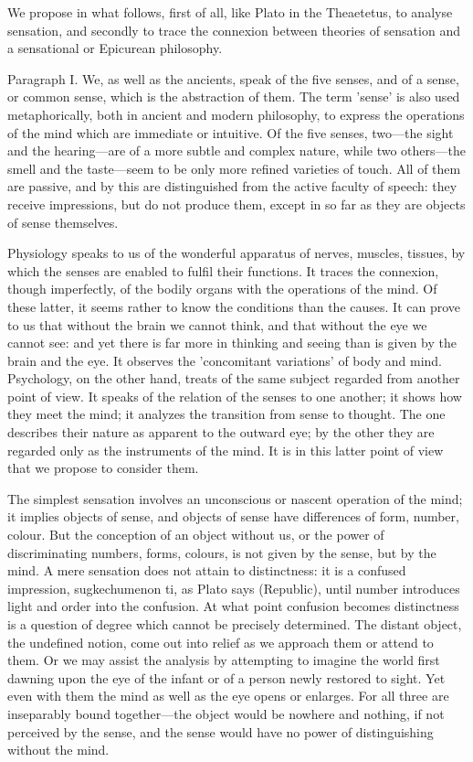 \documentclass[11pt,letter]{article}
\begin{document}
\par  We propose in what follows, first of all, like Plato in the Theaetetus, to analyse sensation, and secondly to trace the connexion between theories of sensation and a sensational or Epicurean philosophy.

\par  Paragraph I. We, as well as the ancients, speak of the five senses, and of a sense, or common sense, which is the abstraction of them. The term 'sense' is also used metaphorically, both in ancient and modern philosophy, to express the operations of the mind which are immediate or intuitive. Of the five senses, two—the sight and the hearing—are of a more subtle and complex nature, while two others—the smell and the taste—seem to be only more refined varieties of touch. All of them are passive, and by this are distinguished from the active faculty of speech: they receive impressions, but do not produce them, except in so far as they are objects of sense themselves.

\par  Physiology speaks to us of the wonderful apparatus of nerves, muscles, tissues, by which the senses are enabled to fulfil their functions. It traces the connexion, though imperfectly, of the bodily organs with the operations of the mind. Of these latter, it seems rather to know the conditions than the causes. It can prove to us that without the brain we cannot think, and that without the eye we cannot see: and yet there is far more in thinking and seeing than is given by the brain and the eye. It observes the 'concomitant variations' of body and mind. Psychology, on the other hand, treats of the same subject regarded from another point of view. It speaks of the relation of the senses to one another; it shows how they meet the mind; it analyzes the transition from sense to thought. The one describes their nature as apparent to the outward eye; by the other they are regarded only as the instruments of the mind. It is in this latter point of view that we propose to consider them.

\par  The simplest sensation involves an unconscious or nascent operation of the mind; it implies objects of sense, and objects of sense have differences of form, number, colour. But the conception of an object without us, or the power of discriminating numbers, forms, colours, is not given by the sense, but by the mind. A mere sensation does not attain to distinctness: it is a confused impression, sugkechumenon ti, as Plato says (Republic), until number introduces light and order into the confusion. At what point confusion becomes distinctness is a question of degree which cannot be precisely determined. The distant object, the undefined notion, come out into relief as we approach them or attend to them. Or we may assist the analysis by attempting to imagine the world first dawning upon the eye of the infant or of a person newly restored to sight. Yet even with them the mind as well as the eye opens or enlarges. For all three are inseparably bound together—the object would be nowhere and nothing, if not perceived by the sense, and the sense would have no power of distinguishing without the mind.
\end{document}

